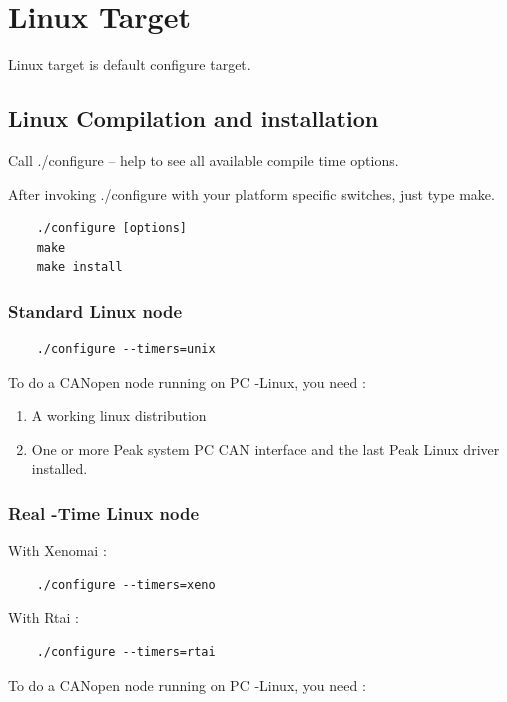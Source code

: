 \documentclass[12pt,english,a4paper]{book}
\newcommand{\canopen}{CANopen }
\begin{document}
\section{Linux Target}

Linux target is default configure target.


\subsection{Linux Compilation and installation}

Call ./configure -- help to see all available compile time options.

After invoking ./configure with your platform specific switches, just
type make.



\begin{verbatim}
	./configure [options]
	make
	make install
\end{verbatim}




\subsubsection{Standard Linux node}


\begin{verbatim}
	./configure --timers=unix
\end{verbatim}


To do a \canopen node running on PC -Linux, you need :

\begin{enumerate}
\item A working linux distribution 
\item One or more Peak system PC CAN interface and the last Peak Linux driver
installed. 
\end{enumerate}

\subsubsection{Real -Time Linux node}

With Xenomai :
\begin{verbatim}
	./configure --timers=xeno
\end{verbatim}
With Rtai :
\begin{verbatim}
	./configure --timers=rtai
\end{verbatim}

To do a \canopen node running on PC -Linux, you need :
\end{document}
